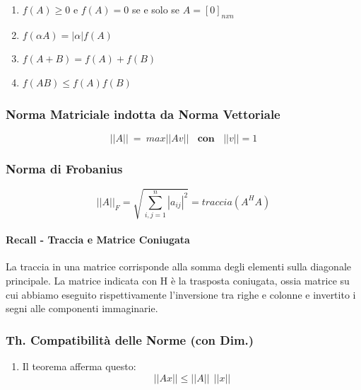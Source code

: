 \documentclass{article}
\begin{document}
\begin{enumerate}
    \item $f(A) \geq 0$ e $f(A) = 0$ se e solo se $A = [0]_{nxn}$
    \item $f(\alpha A) = |\alpha|f(A)$
    \item $f(A+B) = f(A) + f(B)$
    \item $f(AB) \leq f(A)f(B)$
\end{enumerate}

\subsubsection{Norma Matriciale indotta da Norma Vettoriale}

\vspace*{10px}

\[ \boxed{||A|| \: = \: max||Av|| \: \: \: \: \textbf{con} \: \: \: \: ||v|| = 1} \] 

\vspace*{10px}

\subsubsection{Norma di Frobanius}

\vspace*{10px}

\[ \boxed{||A||_{F} = \sqrt{\sum^{n}_{i,j=1}|a_{ij}|^2} = traccia(A^{H}A)} \]

\vspace*{20px}

\paragraph{Recall - Traccia e Matrice Coniugata} La traccia in una matrice corrisponde alla somma degli elementi sulla diagonale principale. La matrice indicata con H è la trasposta coniugata, ossia matrice su cui abbiamo eseguito rispettivamente l'inversione tra righe e colonne e invertito i segni alle componenti immaginarie.

\newpage

\subsubsection{Th. Compatibilità delle Norme (con Dim.)}

\begin{enumerate}
    \item Il teorema afferma questo:
    \vspace*{10px}
    \[ \boxed{||Ax|| \leq ||A||\:\:||x||} \]
\end{enumerate}
\end{document}

